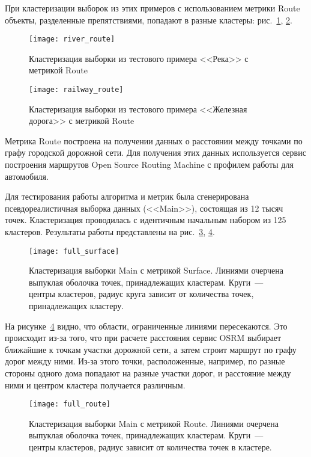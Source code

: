 При кластеризации выборок из этих примеров с использованием метрики Route объекты, разделенные препятствиями, попадают в разные кластеры: рис.~\ref{img:river-route}, \ref{img:railway-route}.

\begin{figure}[ht!]
    \centering
    \texttt{[image: river\_route]}
    \caption{Кластеризация выборки из тестового примера <<Река>> с метрикой Route}
    \label{img:river-route}
    \vspace*{-1ex}
\end{figure}

\begin{figure}[ht!]
    \centering
    \texttt{[image: railway\_route]}
    \caption{Кластеризация выборки из тестового примера <<Железная дорога>> с метрикой Route}
    \label{img:railway-route}
    \vspace*{-1ex}
\end{figure}

Метрика Route построена на получении данных о расстоянии между точками по графу городской дорожной сети. Для получения этих данных используется сервис построения маршрутов Open Source Routing Machine с профилем работы для автомобиля.

Для тестирования работы алгоритма и метрик была сгенерирована псевдореалистичная выборка данных (<<Main>>), состоящая из 12 тысяч точек. Кластеризация проводилась с идентичным начальным набором из 125 кластеров. Результаты работы представлены на рис.~\ref{img:full-surface}, \ref{img:full-route}.
\begin{figure}[ht!]
    \centering
    \texttt{[image: full\_surface]}
    \caption{Кластеризация выборки Main с метрикой Surface. Линиями очерчена выпуклая оболочка точек, принадлежащих кластерам. Круги~--- центры кластеров, радиус круга зависит от количества точек, принадлежащих кластеру.}
    \label{img:full-surface}
    \vspace*{-1ex}
\end{figure}

На рисунке~\ref{img:full-route} видно, что области, ограниченные линиями пересекаются. Это происходит из-за того, что при расчете расстояния сервис OSRM выбирает ближайшие к точкам участки дорожной сети, а затем строит маршрут по графу дорог между ними. Из-за этого точки, расположенные, например, по разные стороны одного дома попадают на разные участки дорог, и расстояние между ними и центром кластера получается различным.
\begin{figure}[t!]
    \centering
    \texttt{[image: full\_route]}
    \caption{Кластеризация выборки Main с метрикой Route. Линиями очерчена выпуклая оболочка точек, принадлежащих кластерам. Круги~--- центры кластеров, радиус зависит от количества точек в кластере.}
    \label{img:full-route}
    \vspace*{-2ex}
\end{figure}

